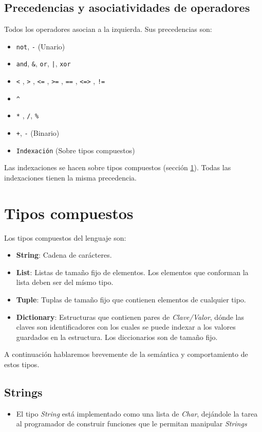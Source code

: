 \documentclass[12pt, spanish]{report}
\begin{document}
\subsection{Precedencias y asociatividades de operadores}
\label{sec:basic_preced}
Todos los operadores asocian a la izquierda. Sus precedencias son:
\begin{itemize}
\item \texttt{not}, \texttt{-} (Unario)
\item \texttt{and}, \texttt{\&}, \texttt{or}, \texttt{|}, \texttt{xor}
\item \texttt{<} , \texttt{>} , \texttt{<=} , \texttt{>=} , \texttt{==} , \texttt{<=>} , \texttt{!=}
\item \texttt{\^}
\item \texttt{*} ,  \texttt{/}, \texttt{\%}
\item \texttt{+}, \texttt{-} (Binario)
\item \texttt{Indexaci\'on} (Sobre tipos compuestos)
\end{itemize}
Las indexaciones se hacen sobre tipos compuestos (secci\'on \ref{sec:tiposcompuestos}).
Todas las indexaciones tienen la misma precedencia.

\section{Tipos compuestos}
\label{sec:tiposcompuestos}

Los tipos compuestos del lenguaje son:

\begin{itemize}
\item \textbf{String}: Cadena de car\'acteres.
\item \textbf{List}: Listas de tama\~no fijo de elementos. Los
  elementos que conforman la lista deben ser del m\'ismo tipo.
\item \textbf{Tuple}: Tuplas de tama\~no fijo que contienen elementos de
  cualquier tipo.
\item \textbf{Dictionary}: Estructuras que contienen pares de
  \emph{Clave/Valor}, d\'onde las claves son identificadores con los
  cuales se puede indexar a los valores guardados en la
  estructura. Los diccionarios son de tamaño fijo.
\end{itemize}

A continuaci\'on hablaremos brevemente de la sem\'antica y
comportamiento de estos tipos.

\subsection{Strings}
\label{sec:strings}
\begin{itemize}
\item El tipo \emph{String} est\'a implementado como una lista de
  \emph{Char}, dej\'andole la tarea al programador de construir
  funciones que le permitan manipular \emph{Strings}
\end{itemize}
\end{document}
